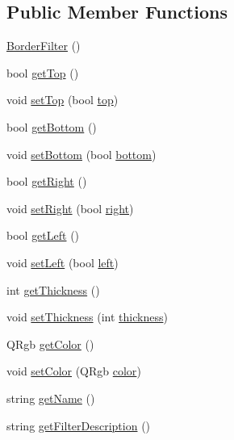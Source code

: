 \subsection*{Public Member Functions}
\begin{DoxyCompactItemize}
\item 
\hyperlink{classModel_1_1BorderFilter_a293d30704fa72a0dad9ea5ef7e473c38}{Border\+Filter} ()
\item 
bool \hyperlink{classModel_1_1BorderFilter_a7f662ce666098754b0916a828633f842}{get\+Top} ()
\item 
void \hyperlink{classModel_1_1BorderFilter_a41a3d0253d877ec681fc30f85ae21aed}{set\+Top} (bool \hyperlink{classModel_1_1BorderFilter_a5c6956f4ef8974f2548e3189232cf019}{top})
\item 
bool \hyperlink{classModel_1_1BorderFilter_ac96fcca335b0daaa5e216993666a7af2}{get\+Bottom} ()
\item 
void \hyperlink{classModel_1_1BorderFilter_ae60a4cf24fcd4cc34ca831917a609e79}{set\+Bottom} (bool \hyperlink{classModel_1_1BorderFilter_abb167350350ffbc934382b6d3ecafead}{bottom})
\item 
bool \hyperlink{classModel_1_1BorderFilter_a09836b29d544b94e145dd6a725887dd2}{get\+Right} ()
\item 
void \hyperlink{classModel_1_1BorderFilter_a18165f5951ddba8f3b25b2a199f90bc1}{set\+Right} (bool \hyperlink{classModel_1_1BorderFilter_acd047173db926d54ee91589f7ab53492}{right})
\item 
bool \hyperlink{classModel_1_1BorderFilter_afb561071d09e3b031b1d951c51e94f24}{get\+Left} ()
\item 
void \hyperlink{classModel_1_1BorderFilter_a07821fa96843dccb8ee4c9a711f1f43b}{set\+Left} (bool \hyperlink{classModel_1_1BorderFilter_aef0ceba738a4b7216ac568b5a5c137d3}{left})
\item 
int \hyperlink{classModel_1_1BorderFilter_ab6b7bfb33162f992d1bb4e8d6699abef}{get\+Thickness} ()
\item 
void \hyperlink{classModel_1_1BorderFilter_ae2faef96ee1277d229d6b6988c66e6d3}{set\+Thickness} (int \hyperlink{classModel_1_1BorderFilter_a4ae4bed5e7efe23b97dad176fe6524c3}{thickness})
\item 
Q\+Rgb \hyperlink{classModel_1_1BorderFilter_ae697defefbdf5f895406269b15758d91}{get\+Color} ()
\item 
void \hyperlink{classModel_1_1BorderFilter_ad858846447f303e473dc8004ef607666}{set\+Color} (Q\+Rgb \hyperlink{classModel_1_1BorderFilter_a6e0c08bd2043c82b2e837117d811db91}{color})
\item 
string \hyperlink{classModel_1_1BorderFilter_a11335e13e50af74108bf926dc1340b4b}{get\+Name} ()
\item 
string \hyperlink{classModel_1_1BorderFilter_a62b7b60e24f92234393b840b35808e06}{get\+Filter\+Description} ()
\end{DoxyCompactItemize}
